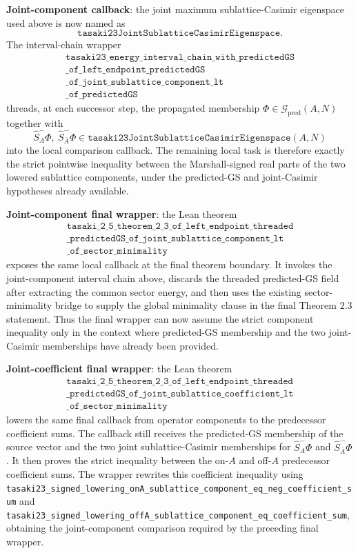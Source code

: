 \documentclass[a4paper,11pt]{article}
\begin{document}
\textbf{Joint-component callback}: the joint maximum sublattice-Casimir
eigenspace used above is now named as
\[
\texttt{tasaki23JointSublatticeCasimirEigenspace}.
\]
The interval-chain wrapper
\[
\begin{gathered}
\texttt{tasaki23\_energy\_interval\_chain\_with\_predictedGS}\\
\texttt{\_of\_left\_endpoint\_predictedGS}\\
\texttt{\_of\_joint\_sublattice\_component\_lt}\\
\texttt{\_of\_predictedGS}
\end{gathered}
\]
threads, at each successor step, the propagated membership
\(\Phi\in\mathcal G_{\mathrm{pred}}(A,N)\) together with
\[
  \hat S_A^-\Phi,\ \hat S_{\bar A}^-\Phi
    \in \texttt{tasaki23JointSublatticeCasimirEigenspace}(A,N)
\]
into the local comparison callback.  The remaining local task is
therefore exactly the strict pointwise inequality between the
Marshall-signed real parts of the two lowered sublattice components,
under the predicted-GS and joint-Casimir hypotheses already available.

\textbf{Joint-component final wrapper}: the Lean theorem
\[
\begin{gathered}
\texttt{tasaki\_2\_5\_theorem\_2\_3\_of\_left\_endpoint\_threaded}\\
\texttt{\_predictedGS\_of\_joint\_sublattice\_component\_lt}\\
\texttt{\_of\_sector\_minimality}
\end{gathered}
\]
exposes the same local callback at the final theorem boundary.  It
invokes the joint-component interval chain above, discards the threaded
predicted-GS field after extracting the common sector energy, and then
uses the existing sector-minimality bridge to supply the global
minimality clause in the final Theorem 2.3 statement.  Thus the final
wrapper can now assume the strict component inequality only in the
context where predicted-GS membership and the two joint-Casimir
memberships have already been provided.

\textbf{Joint-coefficient final wrapper}: the Lean theorem
\[
\begin{gathered}
\texttt{tasaki\_2\_5\_theorem\_2\_3\_of\_left\_endpoint\_threaded}\\
\texttt{\_predictedGS\_of\_joint\_sublattice\_coefficient\_lt}\\
\texttt{\_of\_sector\_minimality}
\end{gathered}
\]
lowers the same final callback from operator components to the
predecessor coefficient sums.  The callback still receives the
predicted-GS membership of the source vector and the two joint
sublattice-Casimir memberships for \(\hat S_A^-\Phi\) and
\(\hat S_{\bar A}^-\Phi\).  It then proves the strict inequality
between the on-\(A\) and off-\(A\) predecessor coefficient sums.  The
wrapper rewrites this coefficient inequality using
\texttt{tasaki23\_signed\_lowering\_onA\_sublattice\_component\_eq\_neg\_coefficient\_sum}
and
\texttt{tasaki23\_signed\_lowering\_offA\_sublattice\_component\_eq\_coefficient\_sum},
obtaining the joint-component comparison required by the preceding
final wrapper.
\end{document}
